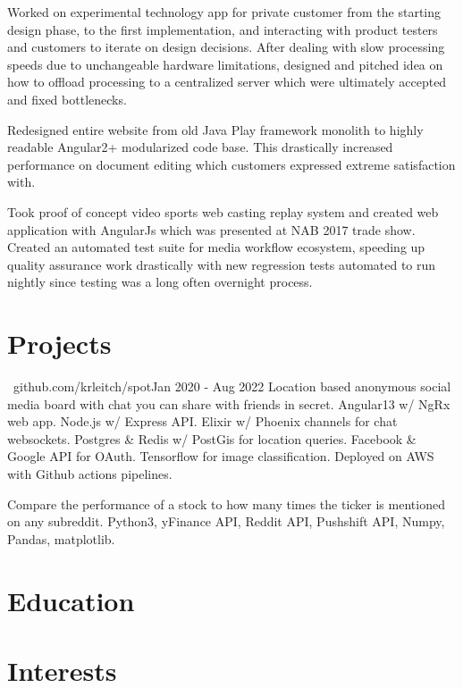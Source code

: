 \documentclass{my_resume}
\begin{document}
\workitemstwo
{Worked on experimental technology app for private customer from the starting design phase, to the first implementation, and interacting
with product testers and customers to iterate on design decisions.}
{After dealing with slow processing speeds due to unchangeable hardware limitations, designed and pitched idea on how to offload
processing to a centralized server which were ultimately accepted and fixed bottlenecks.}

\workitemsone
{Redesigned entire website from old Java Play framework monolith to highly readable Angular2+ modularized code base. This drastically increased performance
 on document editing which customers expressed extreme satisfaction with.}

\workitemstwo
{Took proof of concept video sports web casting replay system and created web application with AngularJs
 which was presented at NAB 2017 trade show.}
{Created an automated test suite for media workflow ecosystem, speeding up quality assurance work drastically with new regression tests
 automated to run nightly since testing was a long often overnight process.}

 \section{Projects}

{\faGithub~github.com/krleitch/spot}{Jan 2020 - Aug 2022}
\projectitem
{Location based anonymous social media board with chat you can share with friends in secret.}
{Angular13 w/ NgRx web app. Node.js w/ Express API. Elixir w/ Phoenix channels for chat websockets. Postgres \& Redis w/ PostGis for location queries. Facebook \& Google API for OAuth. Tensorflow for image classification. Deployed on AWS with Github actions pipelines.}

\projectitem
{Compare the performance of a stock to how many times the ticker is mentioned on any subreddit.}
{Python3, yFinance API, Reddit API, Pushshift API, Numpy, Pandas, matplotlib.}

\section{Education}

\section{Interests}
\end{document}
